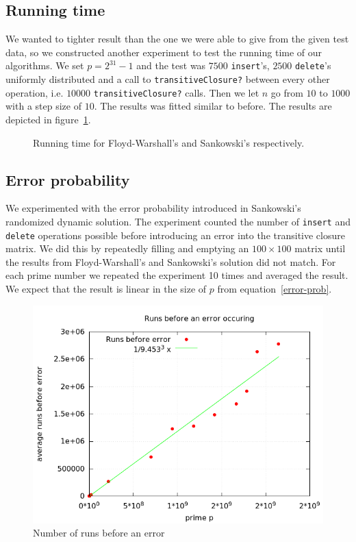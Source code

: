\documentclass[a4paper,oneside,article,11pt]{memoir}
\begin{document}
\subsection{Running time}
We wanted to tighter result than the one we were able to give from the given test data, so we constructed another experiment to test the running time of our algorithms. We set $p=2^{31}-1$ and the test was $7500$ \texttt{insert}'s, $2500$ \texttt{delete}'s uniformly distributed and a call to \texttt{transitiveClosure?} between every other operation, i.e. $10000$ \texttt{transitiveClosure?} calls. Then we let $n$ go from $10$ to $1000$ with a step size of $10$. The results was fitted similar to before. The results are depicted in figure~\ref{fig:running}.

\begin{figure}[ht]
\caption{Running time for Floyd-Warshall's and Sankowski's respectively.}
\label{fig:running}
\end{figure}

\subsection{Error probability}
We experimented with the error probability introduced in Sankowski's randomized dynamic solution. The experiment counted the number of \texttt{insert} and \texttt{delete} operations possible before introducing an error into the transitive closure matrix. We did this by repeatedly filling and emptying an $100 \times 100$ matrix until the results from Floyd-Warshall's and Sankowski's solution did not match. For each prime number we repeated the experiment 10 times and averaged the result. We expect that the result is linear in the size of $p$ from equation~\ref{error-prob}.
\begin{figure}[ht]
\includegraphics[width=\textwidth]{images/error-probability2.png}
\caption{Number of runs before an error}
\label{fig:num-runs}
\end{figure}


\end{document}
